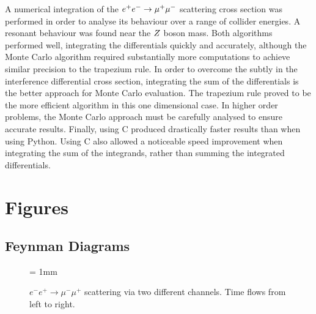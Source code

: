 \documentclass[]{article}
\begin{document}
A numerical integration of the $e^+ e^-  \rightarrow \mathrm{\mu^+ \mu^-} $ scattering cross section was performed in order to analyse its behaviour over a range of collider energies. A resonant behaviour was found near the $Z $ boson mass. Both algorithms performed well, integrating the differentials quickly and accurately, although the Monte Carlo algorithm required substantially more computations to achieve similar precision to the trapezium rule. In order to overcome the subtly in the interference differential cross section, integrating the sum of the differentials is the better approach for Monte Carlo evaluation. The trapezium rule proved to be the more efficient algorithm in this one dimensional case. In higher order problems, the Monte Carlo approach must be carefully analysed to ensure accurate results. Finally, using C produced drastically faster results than when using Python. Using C also allowed a noticeable speed improvement when integrating the sum of the integrands, rather than summing the integrated differentials.

\section{Figures}

\subsection{Feynman Diagrams}

\begin{figure}[H]
	\vspace{10pt}
	\unitlength = 1mm
	\centering
	\qquad\qquad
	\caption{$e^{-}e^{+}\to\mu^{-}\mu^{+}$ scattering via two different channels. Time flows from left to right.}
\end{figure}
\end{document}
